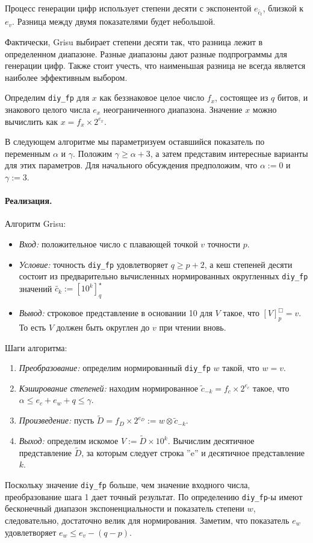 \documentclass[a4paper, 12pt, twoside]{article}
\begin{document}
Процесс генерации цифр использует степени десяти с экспонентой $e_{\tilde{c_t}}$, близкой к $e_v$. 
Разница между двумя показателями будет небольшой.

Фактически, \textsf{Grisu} выбирает степени десяти так, что разница лежит в определенном диапазоне. 
Разные диапазоны дают разные подпрограммы для генерации цифр.
Также стоит учесть, что наименьшая разница не всегда является наиболее эффективным выбором.

Определим \texttt{diy\_fp} для $x$ как беззнаковое целое число $f_x$, состоящее из $q$ битов, и знакового целого числа $e_x$ неограниченного диапазона. 
Значение $x$ можно вычислить как $x= f_x \times 2^{e_x}$.

В следующем алгоритме мы параметризуем оставшийся показатель по переменным $\alpha$ и $\gamma$. 
Положим $\gamma \geqslant \alpha + 3$, а затем представим интересные варианты для этих параметров. 
Для начального обсуждения предположим, что $\alpha := 0$ и $\gamma := 3$.

\paragraph{Реализация.}
Алгоритм \textsf{Grisu}: \begin{itemize}
\item \textit{Вход:} положительное число с плавающей точкой $v$ точности $p$.
\item \textit{Условие:} точность \texttt{diy\_fp} удовлетворяет $q \geqslant p + 2$, а кеш степеней десяти состоит из предварительно вычисленных нормированных округленных  \texttt{diy\_fp} значений $\tilde{c_k} := \left[ 10^k \right]_q^{\star}$
\item \textit{Вывод:} строковое представление в основании 10 для $V$ такое, что $[V]^{\Box}_p = v$. 
То есть $V$ должен быть округлен до $v$ при чтении вновь.
\end{itemize}

Шаги алгоритма:
\begin{enumerate}
\item \textit{Преобразование:} определим нормированный \texttt{diy\_fp} $w$ такой, что $w = v$.
\item \textit{Кэширование степеней:} находим нормированное $\tilde{c}_{-k} = f_c \times 2^{e_c}$ такое, что $\alpha \leqslant e_c + e_w + q \leqslant \gamma$.
\item \textit{Произведение:} пусть $\tilde{D} = f_D \times 2^{e_D} := w \otimes \tilde{c}_{-k}$.
\item \textit{Выход:} определим искомое $V := \tilde{D} \times 10^k$. 
Вычислим десятичное представление $\tilde{D}$, за которым следует строка ''e'' и десятичное представление $k$.
\end{enumerate}
Поскольку значение \texttt{diy\_fp} больше, чем значение входного числа, преобразование шага 1 дает точный результат. 
По определению \texttt{diy\_fp}-ы имеют бесконечный диапазон экспоненциальности и показатель степени $w$, следовательно, достаточно велик для нормирования. 
Заметим, что показатель $e_w$ удовлетворяет $e_w \leqslant e_v - (q - p)$. 
\end{document}
